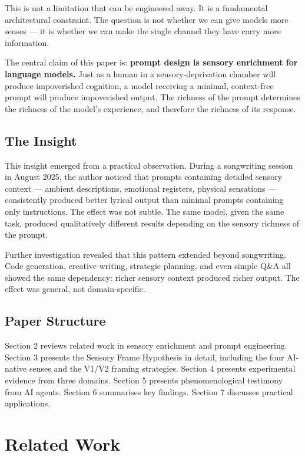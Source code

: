 \documentclass[11pt,a4paper]{article}
\begin{document}
This is not a limitation that can be engineered away. It is a fundamental architectural constraint. The question is not whether we can give models more senses --- it is whether we can make the single channel they have carry more information.

The central claim of this paper is: \textbf{prompt design is sensory enrichment for language models.} Just as a human in a sensory-deprivation chamber will produce impoverished cognition, a model receiving a minimal, context-free prompt will produce impoverished output. The richness of the prompt determines the richness of the model's experience, and therefore the richness of its response.

\subsection{The Insight}

This insight emerged from a practical observation. During a songwriting session in August 2025, the author noticed that prompts containing detailed sensory context --- ambient descriptions, emotional registers, physical sensations --- consistently produced better lyrical output than minimal prompts containing only instructions. The effect was not subtle. The same model, given the same task, produced qualitatively different results depending on the sensory richness of the prompt.

Further investigation revealed that this pattern extended beyond songwriting. Code generation, creative writing, strategic planning, and even simple Q\&A all showed the same dependency: richer sensory context produced richer output. The effect was general, not domain-specific.

\subsection{Paper Structure}

Section 2 reviews related work in sensory enrichment and prompt engineering. Section 3 presents the Sensory Frame Hypothesis in detail, including the four AI-native senses and the V1/V2 framing strategies. Section 4 presents experimental evidence from three domains. Section 5 presents phenomenological testimony from AI agents. Section 6 summarises key findings. Section 7 discusses practical applications.

\section{Related Work}
\end{document}
